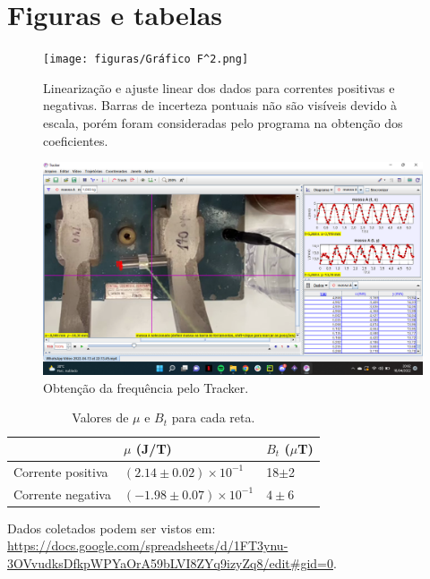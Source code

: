 \section{Figuras e tabelas}
\begin{figure}[ht!]
\centering
\texttt{[image: figuras/Gráfico F^2.png]}
\caption{\small{Linearização e ajuste linear dos dados para correntes positivas e negativas. Barras de incerteza pontuais não são visíveis devido à escala, porém foram consideradas pelo programa na obtenção dos coeficientes.}}
\label{fig:1}
\end{figure}

\begin{figure}[ht!]
\centering
\includegraphics[width = 11 cm]{figuras/Captura de Tela (78).png}
\caption{\small{Obtenção da frequência pelo Tracker.}}
\label{fig:1}
\end{figure}



\begin{table}[ht!]
\center
\begin{tabular}{|l|l|l|}
\hline
 & $\mu$ (J/T)& $B_t$  ($\mu$T)\\ \hline
Corrente positiva &$(2.14 \pm 0.02) \times 10^{-1}$& 18$\pm$2 \\ \hline
Corrente negativa &$(-1.98 \pm 0.07) \times 10^{-1}$ & $4 \pm 6$ 
\\ \hline
\end{tabular}
\caption{Valores de $\mu$ e $B_t$ para cada reta.}
\label{tab:1}
\end{table}

Dados coletados podem ser vistos em: \url{https://docs.google.com/spreadsheets/d/1FT3ynu-3OVvudksDfkpWPYaOrA59bLVI8ZYq9izyZq8/edit#gid=0}.

